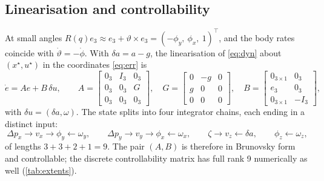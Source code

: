 \documentclass[11pt,a4paper]{article}
\begin{document}
\subsection{Linearisation and controllability}
At small angles $R(q)e_3\approx e_3+\vartheta\times e_3=(-\phi_y,\ \phi_x,\ 1)^\top$, and the body rates
coincide with $\dot\vartheta=-\dot\phi$. With $\delta a=a-g$, the linearisation of \eqref{eq:dyn} about
$(x^\star,u^\star)$ in the coordinates \eqref{eq:err} is
\begin{equation}
\dot e = A e + B\,\delta u,\qquad
A=\begin{bmatrix}0_3 & I_3 & 0_3\\ 0_3 & 0_3 & G\\ 0_3 & 0_3 & 0_3\end{bmatrix},\quad
G=\begin{bmatrix}0&-g&0\\ g&0&0\\ 0&0&0\end{bmatrix},\quad
B=\begin{bmatrix}0_{3\times1} & 0_3\\ e_3 & 0_3\\ 0_{3\times1} & -I_3\end{bmatrix},
\label{eq:lin}
\end{equation}
with $\delta u=(\delta a,\omega)$. The state splits into four integrator chains, each ending in a distinct input:
\[
\Delta p_x\to v_x\to\phi_y\leftarrow\omega_y,\qquad \Delta p_y\to v_y\to\phi_x\leftarrow\omega_x,\qquad
\zeta\to v_z\leftarrow\delta a,\qquad \phi_z\leftarrow\omega_z,
\]
of lengths $3+3+2+1=9$. The pair $(A,B)$ is therefore in Brunovsky form and controllable; the discrete
controllability matrix has full rank 9 numerically as well (\cref{tab:extents}).
\end{document}
